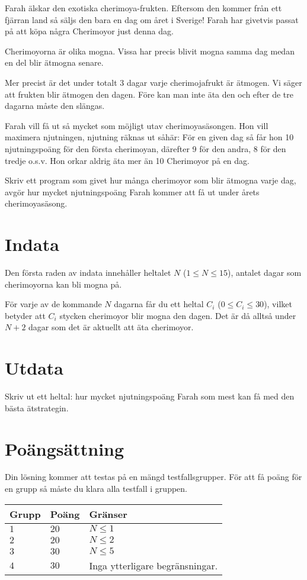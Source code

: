 
Farah älskar den exotiska cherimoya-frukten. Eftersom den kommer från ett
fjärran land så säljs den bara en dag om året i Sverige! Farah har givetvis
passat på att köpa några Cherimoyor just denna dag.

Cherimoyorna är olika mogna. Vissa har precis blivit mogna samma dag medan en
del blir ätmogna senare.

Mer precist är det under totalt 3 dagar varje cherimojafrukt är ätmogen. Vi
säger att frukten blir ätmogen den dagen. Före kan man inte äta den och efter de
tre dagarna måste den slängas.

Farah vill få ut så mycket som möjligt utav cherimoyasäsongen. Hon vill
maximera njutningen, njutning räknas ut såhär: För en given dag så får hon 10
njutningspoäng för den första cherimoyan, därefter 9 för den andra, 8 för den
tredje o.s.v. Hon orkar aldrig äta mer än 10 Cherimoyor på en dag.

Skriv ett program som givet hur många cherimoyor som blir ätmogna varje dag,
avgör hur mycket njutningspoäng Farah kommer att få ut under årets
cherimoyasäsong.

\section*{Indata}
Den första raden av indata innehåller heltalet $N$ ($1 \leq N \leq 15$), antalet
dagar som cherimoyorna kan bli mogna på.

För varje av de kommande $N$ dagarna får du ett heltal $C_i$ ($0 \leq C_i \leq 30$),
vilket betyder att $C_i$ stycken cherimoyor blir mogna den dagen.
Det är då alltså under $N+2$ dagar som det är aktuellt att äta cherimoyor.

\section*{Utdata}
Skriv ut ett heltal: hur mycket njutningspoäng Farah som
mest kan få med den bästa ätstrategin.

\section*{Poängsättning}
Din lösning kommer att testas på en mängd testfallsgrupper.
För att få poäng för en grupp så måste du klara alla testfall i gruppen.

\noindent
\begin{tabular}{| l | l | p{12cm} |}
  \hline
  \textbf{Grupp} & \textbf{Poäng} & \textbf{Gränser} \\ \hline
  $1$    & $20$       & $N \leq 1$ \\ \hline
  $2$    & $20$       & $N \leq 2$ \\ \hline
  $3$    & $30$       & $N \leq 5$ \\ \hline
  $4$    & $30$       & Inga ytterligare begränsningar. \\ \hline
\end{tabular}

